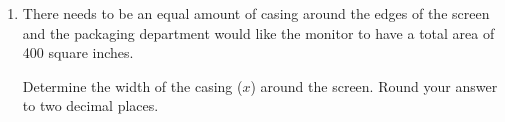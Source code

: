 \documentclass[letterpaper,12pt,fleqn]{article}
\begin{document}
\begin{enumerate}
\begin{enumerate}
\newpage

\item There needs to be an equal amount of casing around the edges of the
screen and the packaging department would like the monitor to have a total
area of 400 square inches.

\begin{figure}[h]
\setlength{\leftskip}{1in}
\end{figure}

Determine the width of the casing ($x$) around the screen. Round your answer to
two decimal places.
\end{enumerate}

\end{enumerate}
\end{document}
